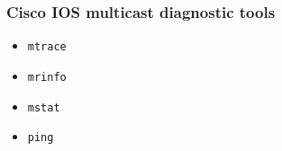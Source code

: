 \documentclass{../UTNetLab}
\begin{document}
\subsubsection{Cisco IOS multicast diagnostic tools}
\begin{itemize}
    \item \lstinline[language={cisco}]{mtrace}
    \item \lstinline[language={cisco}]{mrinfo}
    \item \lstinline[language={cisco}]{mstat}
    \item \lstinline[language={cisco}]{ping}
\end{itemize}
\end{document}
